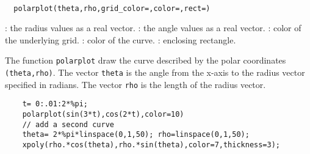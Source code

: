 
\begin{mandesc}
  \\
\end{mandesc}
\begin{calling_sequence}
\begin{verbatim}
  polarplot(theta,rho,grid_color=,color=,rect=)
\end{verbatim}
\end{calling_sequence}

\begin{parameters}
  \begin{varlist}
    : the radius values as a real vector.
    : the angle values as a real vector.
    : color of the underlying grid.
    : color of the curve.
    : enclosing rectangle.
  \end{varlist}
\end{parameters}

\begin{mandescription}
  The function \verb!polarplot! draw the curve described by the polar coordinates \verb!(theta,rho)!.
  The vector \verb!theta! is the angle from the x-axis to the radius vector specified in radians.
  The vector \verb!rho! is the length of the radius vector.
\end{mandescription}

\begin{examples}
  \begin{Verbatim}
    t= 0:.01:2*%pi;
    polarplot(sin(3*t),cos(2*t),color=10)
    // add a second curve
    theta= 2*%pi*linspace(0,1,50); rho=linspace(0,1,50);
    xpoly(rho.*cos(theta),rho.*sin(theta),color=7,thickness=3);
  \end{Verbatim}
\end{examples}
